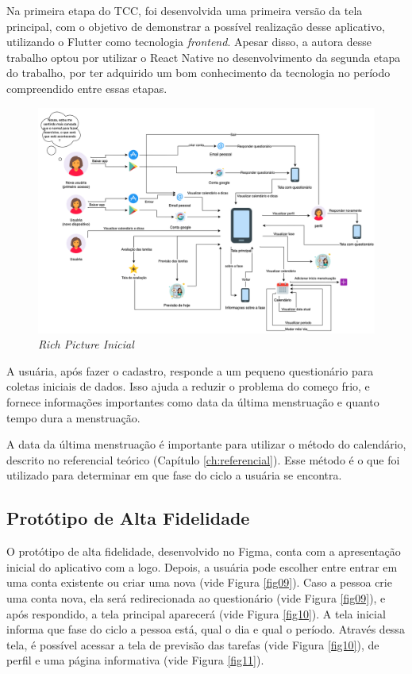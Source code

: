 Na primeira etapa do TCC, foi desenvolvida uma primeira versão da tela principal, com o objetivo de demonstrar a possível 
realização desse aplicativo, utilizando o Flutter como tecnologia \emph{frontend}. Apesar disso, a autora desse trabalho 
optou por utilizar o React Native no desenvolvimento da segunda etapa do trabalho, 
por ter adquirido um bom conhecimento da tecnologia no período compreendido entre essas etapas.
 
\begin{figure}[ht]
	\caption{\emph{Rich Picture Inicial}}
	\begin{center}
	\includegraphics[keepaspectratio=true,scale=0.37]{figuras/richPicture.png}
	\end{center}
    \label{fig08}
\end{figure}

A usuária, após fazer o cadastro, responde a um pequeno 
questionário para coletas iniciais de dados. Isso ajuda a reduzir 
o problema do começo frio, e fornece informações importantes
como data da última menstruação e quanto tempo dura a menstruação.

A data da última menstruação é importante para utilizar o 
método do calendário, descrito no referencial teórico (Capítulo \ref{ch:referencial}). 
Esse método é o que foi utilizado para determinar em que 
fase do ciclo a usuária se encontra.

\subsection{Protótipo de Alta Fidelidade}

O protótipo de alta fidelidade, desenvolvido no Figma, conta com a apresentação 
inicial do aplicativo com a logo. Depois, a usuária 
pode escolher entre entrar em uma conta existente ou criar 
uma nova (vide Figura \ref{fig09}). Caso a pessoa crie uma conta 
nova, ela será 
redirecionada ao questionário (vide Figura \ref{fig09}), e após 
respondido, a 
tela principal aparecerá (vide Figura \ref{fig10}). A tela inicial informa que 
fase do ciclo a pessoa está, qual o dia 
e qual o período. Através dessa tela, é possível acessar 
a tela de previsão das tarefas (vide Figura \ref{fig10}), de perfil
e uma página informativa (vide Figura \ref{fig11}).

